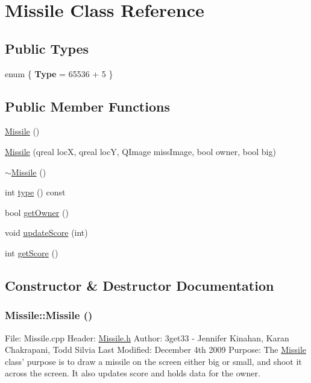 \hypertarget{class_missile}{
\section{Missile Class Reference}
\label{class_missile}
}
\subsection*{Public Types}
\begin{DoxyCompactItemize}
\item 
enum \{ {\bfseries Type} =  65536 + 5
 \}
\end{DoxyCompactItemize}
\subsection*{Public Member Functions}
\begin{DoxyCompactItemize}
\item 
\hyperlink{class_missile_aa5ce8791a8e7ebd4ea0afab390b73a1a}{Missile} ()
\item 
\hyperlink{class_missile_a4698129ffe314da23ae2fdc074c1aaa4}{Missile} (qreal locX, qreal locY, QImage missImage, bool owner, bool big)
\item 
\hyperlink{class_missile_ad42379e48a46ec3556056f98ce8bd912}{$\sim$Missile} ()
\item 
int \hyperlink{class_missile_aa176a8e8b698167fe1b901c4f91a6a31}{type} () const 
\item 
bool \hyperlink{class_missile_ae5d94b0814411d51750eb919f919a440}{getOwner} ()
\item 
void \hyperlink{class_missile_adf81e1df24765a7a9c9878beacd67842}{updateScore} (int)
\item 
int \hyperlink{class_missile_a1287c194f7a2b619fc5ebc126707d29b}{getScore} ()
\end{DoxyCompactItemize}


\subsection{Constructor \& Destructor Documentation}
\hypertarget{class_missile_aa5ce8791a8e7ebd4ea0afab390b73a1a}{
\subsubsection[{Missile}]{\setlength{\rightskip}{0pt plus 5cm}Missile::Missile ()}}
\label{class_missile_aa5ce8791a8e7ebd4ea0afab390b73a1a}
File: Missile.cpp Header: \hyperlink{_missile_8h_source}{Missile.h} Author: 3get33 -\/ Jennifer Kinahan, Karan Chakrapani, Todd Silvia Last Modified: December 4th 2009 Purpose: The \hyperlink{class_missile}{Missile} class' purpose is to draw a missile on the screen either big or small, and shoot it across the screen. It also updates score and holds data for the owner.

